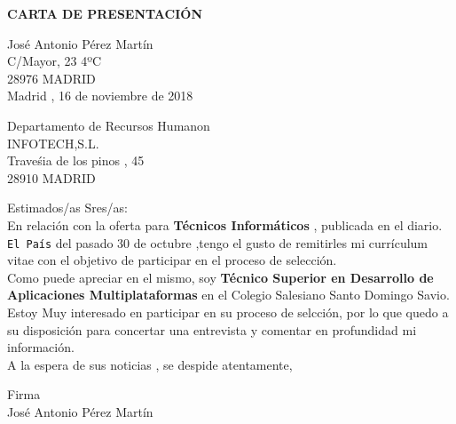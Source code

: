\documentclass[10pt,a4paper]{letter}
\begin{document}
	\begin{center}
		\large \textbf{CARTA DE PRESENTACIÓN}\\
	\end{center}
	\begin{flushright}
		José Antonio Pérez Martín \\
		C/Mayor, 23 4ºC \\
		28976 MADRID \vspace{0.5cm} \\
		Madrid , 16 de noviembre de 2018 \\
	\end{flushright}
	\begin{flushleft}
		Departamento de Recursos Humanon\\
		INFOTECH,S.L.\\
		Traveśia de los pinos , 45 \\
		28910 MADRID \vspace{1.4cm} \\
	\end{flushleft}
		Estimados/as Sres/as: \medskip \\
En relación con la oferta para \textbf{Técnicos Informáticos} , publicada en el diario. \texttt{El País} del pasado 30 de octubre ,tengo el gusto de remitirles mi currículum vitae con el objetivo de participar en el proceso de selección.\medskip  \\
Como puede apreciar en el mismo, soy \textbf{Técnico Superior en Desarrollo 		de Aplicaciones Multiplataformas} en el Colegio Salesiano Santo Domingo Savio. \medskip \\
Estoy Muy interesado en participar en su proceso de selcción, por lo que quedo a su disposición para concertar una entrevista y comentar en 	profundidad mi información.\medskip \\
 		A la espera de sus noticias , se despide atentamente,\\
	 \begin{center}
 		Firma \vspace{3cm} \\
 		José Antonio Pérez Martín\\
 	\end{center}
\end{document}
